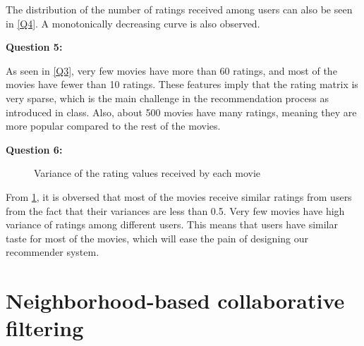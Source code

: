 \documentclass{article}
\begin{document}
The distribution of the number of ratings received among users can also be seen in \ref{Q4}. A monotonically decreasing curve is also observed.
\newline

\bigbreak \textbf{Question 5:}

As seen in \ref{Q3}, very few movies have more than 60 ratings, and most of the movies have fewer than 10 ratings. These features imply that the rating matrix is very sparse, which is the main challenge in the recommendation process as introduced in class. Also, about 500 movies have many ratings, meaning they are more popular compared to the rest of the movies.
\newline

\bigbreak \textbf{Question 6:}

\begin{figure}
\centering
{}
\caption{Variance of the rating values received by each movie} \label{Q6}
\end{figure}

From \ref{Q6}, it is obversed that most of the movies receive similar ratings from users from the fact that their variances are less than 0.5. Very few movies have high variance of ratings among different users. This means that users have similar taste for most of the movies, which will ease the pain of designing our recommender system.
\newline

\section{Neighborhood-based collaborative filtering}
\end{document}
